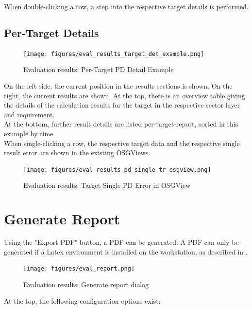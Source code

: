 When double-clicking a row, a step into the respective target details is performed.

\subsection{Per-Target Details}

\begin{figure}[H]
  \hspace*{-2cm}
    \texttt{[image: figures/eval\_results\_target\_det\_example.png]}
  \caption{Evaluation results: Per-Target PD Detail Example}
\end{figure}

On the left side, the current position in the results sections is shown. On the right, the current results are shown. At the top, there is an overview table giving the details of the calculation results for the target in the respective sector layer and requirement. \\

At the bottom, further result details are listed per-target-report, sorted in this example by time. \\

When single-clicking a row, the respective target data and the respective single result error are shown in the existing OSGViews.

\begin{figure}[H]
  \hspace*{-2.5cm}
    \texttt{[image: figures/eval\_results\_pd\_single\_tr\_osgview.png]}
  \caption{Evaluation results: Target Single PD Error in OSGView}
\end{figure}


\section{Generate Report}
\label{sec:eval_report}

Using the "Export PDF" button, a PDF can be generated. A PDF can only be generated if a Latex environment is installed on the workstation, as described in .

\begin{figure}[H]
    \texttt{[image: figures/eval\_report.png]}
  \caption{Evaluation results: Generate report dialog}
\end{figure}

At the top, the following configuration options exist:

